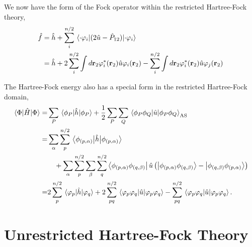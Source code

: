 We now have the form of the Fock operator within the restricted Hartree-Fock theory,
\begin{equation}
    \label{eq:RHF_fock_operator}
    \begin{aligned}
    \hat{f} &= \hat{h} + \sum_i^{n/2} \mel{\cdot\varphi_i}{(2\hat{u} - \hat{P}_{12})}{\cdot\varphi_i} \\
        &= \hat{h} + 2\sum_i^{n/2} \int d\vb{r}_2 \varphi_i^*(\vb{r}_2) \hat{u} \varphi_i(\vb{r}_2)
        -\sum_i^{n/2} \int d\vb{r}_2 \varphi_i^*(\vb{r}_2) \hat{u} \varphi_j(\vb{r}_2)
    \end{aligned}
\end{equation}

The Hartree-Fock energy also has a special form in the restricted Hartree-Fock domain,
\begin{equation}
    \begin{aligned}
        \mel{\Phi}{\hat{H}}{\Phi}
        =& \sum_P \mel{\phi_P}{\hat{h}}{\phi_P}
        + \frac{1}{2}\sum_P \sum_Q \mel{\phi_P \phi_Q}{\hat{u}}{\phi_P \phi_Q}_\text{AS} \\
        =& \sum_\alpha \sum_p^{n/2} \mel{\phi_{(p,\alpha)}}{\hat{h}}{\phi_{(p,\alpha)}} \\
            &\quad + \sum_\alpha \sum_p^{n/2}\sum_\beta \sum_q^{n/2} 
        \bra{\phi_{(p,\alpha)}\phi_{(q,\beta)}}\hat{u}
        \left( 
            \ket{\phi_{(p,\alpha)}\phi_{(q,\beta)}} - \ket{\phi_{(q,\beta)}\phi_{(p,\alpha)}} 
        \right) \\
        =& 2\sum_p^{n/2} \mel{\varphi_p}{\hat{h}}{\varphi_q}
        + 2 \sum_{pq}^{n/2} \mel{\varphi_p\varphi_q}{\hat{u}}{\varphi_p\varphi_q}
        - \sum_{pq}^{n/2} \mel{\varphi_p\varphi_q}{\hat{u}}{\varphi_p\varphi_q}.
    \end{aligned}
\end{equation}

\section{Unrestricted Hartree-Fock Theory}

